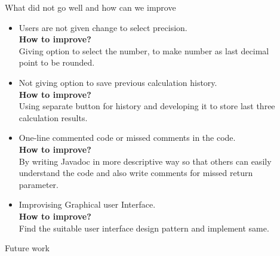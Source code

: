 \documentclass[final]{beamer}
\newlength{\sepwid}
\newlength{\onecolwid}
\newlength{\twocolwid}
\begin{document}
\begin{frame}
\begin{columns}[t]
\begin{column}{\twocolwid}
\begin{columns}[t,totalwidth=\twocolwid]
\begin{column}{\onecolwid}

\end{column} %
\begin{column}{\sepwid}\end{column} %

\begin{column}{\onecolwid}\vspace{-.74in} %


\begin{exampleblock}{What did not go well and how can we improve}
\begin{itemize}
\item Users are not given change to select precision.\\
\textbf{How to improve?}\\
Giving option to select the number, to make number as last decimal point to be rounded.
\item Not giving option to save previous calculation history. \\
\textbf{How to improve?}\\
Using separate button for history and developing it to store last three calculation results.
\item One-line commented code or missed comments in the code. \\
\textbf{How to improve?}\\
By writing Javadoc in more descriptive way so that others can easily understand the code and also write comments for missed return parameter.
\item Improvising Graphical user Interface. \\
\textbf{How to improve?}\\
Find the suitable user interface design pattern and implement same.

\end{itemize}
\end{exampleblock}
\begin{exampleblock}{Future work}


\end{exampleblock}
\end{column}
\end{columns}
\end{column}
\end{columns}
\end{frame}
\end{document}
